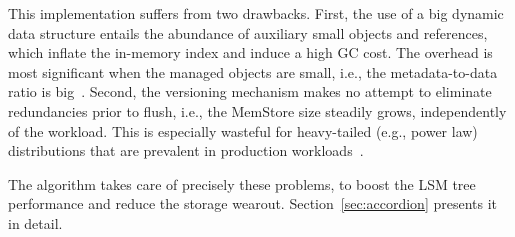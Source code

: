 This implementation suffers from two drawbacks. First, the use of a big dynamic data structure entails 
the abundance of auxiliary small objects and references, which inflate the in-memory index and induce 
a high GC cost. The overhead is most significant when the managed objects are small, i.e., 
the metadata-to-data ratio is big~\cite{Wu2015}. Second, the versioning mechanism 
makes no attempt to eliminate redundancies prior to flush, i.e., the MemStore size  steadily grows, 
independently of the workload. This is especially wasteful for heavy-tailed (e.g., power law) distributions 
that are prevalent in production workloads~\cite{Devineni:2015}. 

The \sys\/ algorithm takes care of precisely these problems, to boost the 
LSM tree performance and reduce the storage wearout. Section~\ref{sec:accordion} 
presents it in detail. 







